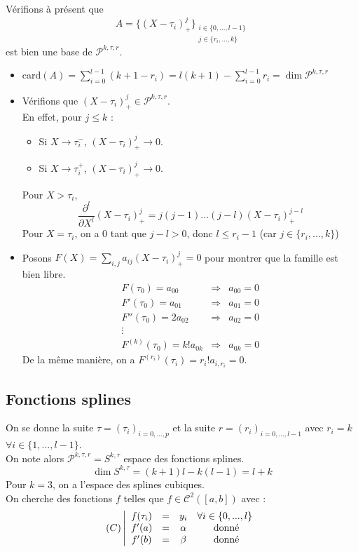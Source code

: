 \begin{dem}
\bigskip
Vérifions à présent que \[A=\{(X-\tau_i)^j_+\}_{\begin{array}{c} i \in \{0,...,l-1\} \\ j\in\{r_i,...,k\} \end{array}}\]
est bien une base de $\mathcal{P}^{k,\tau,r}$.
\begin{itemize}
	\item card$(A)=\sum_{i=0}^{l-1}(k+1-r_i) = l(k+1)-\sum_{i=0}^{l-1} r_i = \dim \mathcal{P}^{k,\tau,r}$
	\item Vérifions que $(X-\tau_i)_+^j\in\mathcal{P}^{k,\tau,r}$.\\
En effet, pour $j\leq k$ :
	\begin{itemize}
		\item Si $X\to \tau_i^-$, $(X-\tau_i)^j_+\to 0$.
		\item Si $X\to \tau_i^+$, $(X-\tau_i)^j_+\to 0$.
	\end{itemize}
	Pour $X>\tau_i$, \[\frac{\partial^l}{\partial X^l} (X-\tau_i)^j_+=j(j-1)...(j-l)(X-\tau_i)^{j-l}_+\]
	Pour $X=\tau_i$, on a 0 tant que $j-l>0$, donc $l\leq r_i-1$ (car $j\in\{r_i,...,k\}$)
	\item Posons $F(X)=\sum_{i,j} a_{ij}(X-\tau_i)^j_+=0$ pour montrer que la famille est bien libre.
	\begin{eqnarray*}
		F(\tau_0)=a_{00} &\Rightarrow& a_{00}=0\\
		F'(\tau_0)=a_{01} &\Rightarrow& a_{01}=0\\
		F''(\tau_0)=2a_{02} &\Rightarrow& a_{02}=0 \\
		\vdots \\
		F^{(k)}(\tau_0)=k!a_{0k} &\Rightarrow& a_{0k}=0
	\end{eqnarray*}
	De la même manière, on a $F^{(r_i)}(\tau_i)=r_i!a_{i,r_i}=0$.
\end{itemize}
\end{dem}

\subsection{Fonctions splines}
On se donne la suite $\tau=(\tau_i)_{i=0,...,p}$ et la suite $r=(r_i)_{i=0,...,l-1}$ avec $r_i=k$ $\forall i\in\{1,...,l-1\}$.\\
On note alors $\mathcal{P}^{k,\tau,r}=S^{k,\tau}$ espace des fonctions splines.
	\[\dim S^{k,\tau}=(k+1)l-k(l-1)=l+k\]
Pour $k=3$, on a l'espace des splines cubiques.\\
On cherche des fonctions $f$ telles que  $f\in\mathcal{C}^2([a,b])$ avec :
\[(C)\left| \begin{array}{c c c c}
f(\tau_i)&=&y_i & \forall i\in\{0,...,l\}\\
f'(a)&=&\alpha & \text{ donné}\\
f'(b)&=&\beta & \text{ donné}
\end{array}\right.\]

